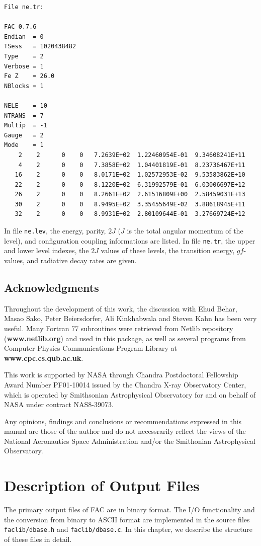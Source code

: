\documentclass[twoside,letterpaper]{refrep}
\begin{document}
\begin{verbatim}
File ne.tr:

FAC 0.7.6
Endian	= 0
TSess	= 1020438482
Type	= 2
Verbose	= 1
Fe Z	= 26.0
NBlocks	= 1

NELE	= 10
NTRANS	= 7
Multip	= -1
Gauge	= 2
Mode	= 1
    2	 2	    0	 0	 7.2639E+02  1.22460954E-01  9.34608241E+11
    4	 2	    0	 0	 7.3858E+02  1.04401819E-01  8.23736467E+11
   16	 2	    0	 0	 8.0171E+02  1.02572953E-02  9.53583862E+10
   22	 2	    0	 0	 8.1220E+02  6.31992579E-01  6.03006697E+12
   26	 2	    0	 0	 8.2661E+02  2.61516809E+00  2.58459031E+13
   30	 2	    0	 0	 8.9495E+02  3.35455649E-02  3.88618945E+11
   32	 2	    0	 0	 8.9931E+02  2.80109644E-01  3.27669724E+12
\end{verbatim}

In file \verb|ne.lev|, the energy, parity, $2J$ ($J$ is the total
angular momentum of the level), and configuration coupling informations are
listed. In file \verb|ne.tr|, the upper and lower level indexes, the $2J$
values of these levels, the transition energy, $gf$-values, and radiative
decay rates are given.

\section*{Acknowledgments}
Throughout the development of this work, the discussion with Ehud Behar, Masao
Sako, Peter Beiersdorfer, Ali Kinkhabwala and Steven Kahn has been very
useful. Many Fortran 77 subroutines were retrieved from Netlib repository
(\textbf{www.netlib.org}) and used in this package, as well as several
programs from Computer Physics Communications Program Library at
\textbf{www.cpc.cs.qub.ac.uk}.

This work is supported by NASA through Chandra Postdoctoral Fellowship Award
Number PF01-10014 issued by the Chandra X-ray Observatory Center, which is
operated by Smithsonian Astrophysical Observatory for and on behalf of NASA
under contract NAS8-39073. 

Any opinions, findings and conclusions or
recommendations expressed in this manual are those of the author and do not
necessrarily reflect the views of the National Aeronautics Space
Administration and/or the Smithonian Astrophysical Observatory.

\chapter{Description of Output Files}
\label{cha:format}
The primary output files of FAC are in binary format. The I/O functionality
and the conversion from binary to ASCII format are implemented in the source
files \verb|faclib/dbase.h| and \verb|faclib/dbase.c|. In this chapter, we
describe the structure of these files in detail.
\end{document}
